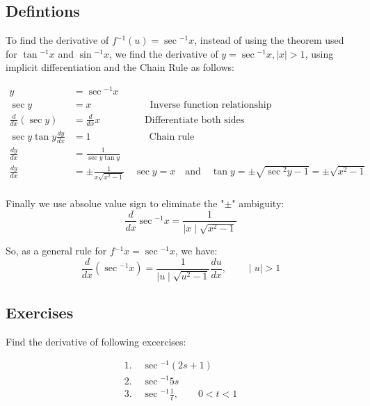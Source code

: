 \documentclass[fleqn]{article}
\begin{document}
\subsection*{Defintions}
\noindent
To find the derivative of $f{^{-1} (u)} = \sec{^{-1} x}$,
instead of using the theorem used for $\tan{^{-1} x}$ and ${\sin{^{-1} x}}$,
we find the derivative of $y = \sec{^{-1} x}, \mid{x}\mid > 1$,
using implicit differentiation and the Chain Rule as follows:
\newline

\begin{align*}
    y &= \sec{^{-1} x} \\
    \sec{y} &= x \qquad\qquad\qquad \text{Inverse function relationship} \\
    \frac{d}{dx}\left(\sec{y}\right) &= \frac{d}{dx}x \qquad\qquad\;\; \text{Differentiate both sides} \\
    \sec{y}\tan{y}\frac{dy}{dx} &= 1 \qquad\qquad\qquad \text{Chain rule} \\
    \frac{dy}{dx} &= \frac{1}{\sec{y}\tan{y}} \\
    \frac{dy}{dx} &= \pm \frac{1}{x \sqrt{x^2 - 1}} \quad \sec{y}
    = x \quad\text{and}\quad \tan{y} = \pm \sqrt{\sec{^2 y} - 1} = \pm \sqrt{x^2 - 1} \\
\end{align*}

\noindent
Finally we use absolue value sign to eliminate the "$\pm$" ambiguity:
\newline
\begin{equation*}
    \frac{d}{dx}\sec{^{-1} x} = \frac{1}{\mid{x}\mid \sqrt{x^2 - 1}}
\end{equation*}

\noindent
So, as a general rule for $f{^{-1} x} = \sec{^{-1} x}$, we have:
\newline
\begin{equation*}
    \frac{d}{dx}\left(\sec{^{-1} x}\right) = \frac{1}{\mid{u}\mid \sqrt{u^2 - 1}}\frac{du}{dx},\qquad\mid{u}\mid > 1
\end{equation*}

\subsection*{Exercises}
\noindent
Find the derivative of following excercises:
\newline

\begin{align*}
1.\;&\sec{^{-1} \left(2s+1\right)} \\
2.\;&\sec{^{-1} 5s} \\
3.\;&\sec{^{-1} \frac{1}{t}},\qquad{0<t<1}
\end{align*}
\end{document}
